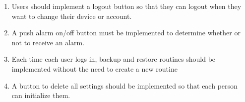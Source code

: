 \begin{enumerate}[label=\arabic*.]
\begin{enumerate}[label*={\arabic*.},ref=\theenumi.\arabic*]
              \item Users should implement a logout button so that they can logout when they want to change their device or account.\\

              \item A push alarm on/off button must be implemented to determine whether or not to receive an alarm.\\

              \item Each time each user logs in, backup and restore routines should be implemented without the need to create a new routine\\

              \item A button to delete all settings should be implemented so that each person can initialize them.\\

          \end{enumerate}
\end{enumerate}
